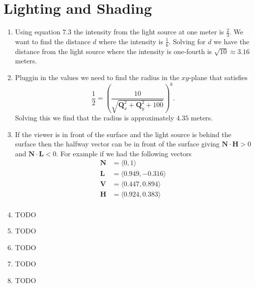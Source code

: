 \documentclass[a4paper]{report}
\begin{document}
\chapter{Lighting and Shading}
\begin{enumerate}
	\item Using equation 7.3 the intensity from the light source at one meter is $\frac{2}{3}$. We want
		to find the distance $d$ where the intensity is $\frac{1}{6}$. Solving for $d$ we have the distance
		from the light source where the intensity is one-fourth is $\sqrt{10} \approx 3.16$ meters.
	\item Pluggin in the values we need to find the radius in the $xy$-plane that satisfies
		\begin{equation*}
			\frac{1}{2} = {\left(\frac{10}{\sqrt{\mathbf{Q}_x^2 + \mathbf{Q}_y^2 + 100}}\right)}^8.
		\end{equation*}
		Solving this we find that the radius is approximately $4.35$ meters.
	\item If the viewer is in front of the surface and the light source is behind the surface then the halfway vector
		can be in front of the surface giving $\mathbf{N} \cdot \mathbf{H} > 0$ and $\mathbf{N} \cdot \mathbf{L} < 0$.
		For example if we had the following vectors
		\begin{align*}
			\mathbf{N} &= \langle 0, 1 \rangle\\
			\mathbf{L} &= \langle 0.949, -0.316 \rangle\\
			\mathbf{V} &= \langle 0.447, 0.894 \rangle\\
			\mathbf{H} &= \langle 0.924, 0.383 \rangle\\
		\end{align*}
	\item TODO %
	\item TODO %
	\item TODO
	\item TODO %
	\item TODO %
\end{enumerate}
\end{document}
